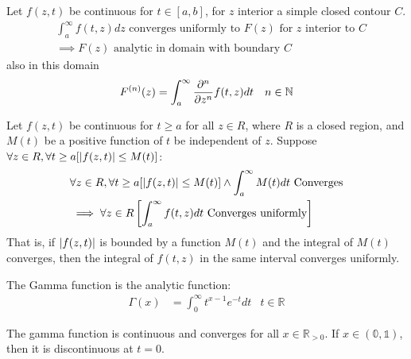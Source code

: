\documentclass[12pt, english]{book}
\begin{document}
	\begin{theorem}
		\label{Analyticity of a Function Defined by an Integration to Infinity Theorem - Complex}
		Let \(f(z, t)\) be continuous for \(t \in [a, b]\), for \(z\) interior a simple closed contour \(C\).
		\begin{align*}
			&\int_{a}^{\infty} f(t, z) dz \text{ converges uniformly to } F(z) \text{ for } z \text{ interior to } C\\
			&\implies F(z) \text{ analytic in domain with boundary } C
		\end{align*}
		also in this domain
		\begin{align*}
			F^{(n)} (z) &= \int_{a}^{\infty} \pdv[n]{z} f(t, z) dt 
			& n \in \mathbb{N}
		\end{align*}
	\end{theorem}
	
	\begin{theorem}
		\label{M-Test for Integration to Infinity Theorem - Complex}
		Let \(f(z, t)\) be continuous for \(t \geq a\) for all \(z \in R\), where \(R\) is a closed region, and \(M(t)\) be a positive function of \(t\) be independent of \(z\). Suppose \(\forall z \in R, \forall t \geq a [\abs{f(z, t)} \leq M(t)]\):
		\begin{align*}
			&\forall z \in R, \forall t \geq a [\abs{f(z, t)} \leq M(t)] \land
			\int_{a}^{\infty} M(t) dt \text{ Converges} \\
			&\implies \forall z \in R 
				\left[\int_{a}^{\infty} f(t, z) dt \text{ Converges uniformly}\right]
		\end{align*}
		That is, if \(\abs{f(z,t)}\) is bounded by a function \(M(t)\) and the integral of \(M(t)\) converges, then the integral of \(f(t, z)\) in the same interval converges uniformly.
	\end{theorem}

	\begin{definition}
		\label{Gamma Function Definition - Complex}
		The Gamma function is the analytic function:
		\begin{align*}
			\Gamma(x) &= \int_{0}^{\infty} t^{x-1} e^{-t} dt
				& t \in \mathbb{R}
		\end{align*}
	\end{definition}

	The gamma function is continuous and converges for all \(x \in \mathbb{R}_{>0}\). If \(x \in \mathbb{(0,1)}\), then it is discontinuous at \(t=0\).
	
\end{document}
